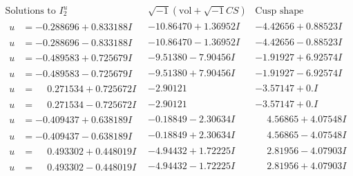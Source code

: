 \documentclass[1p]{elsarticle_modified}
\theoremstyle{definition}
\newcommand{\I}{\sqrt{-1}}
\begin{document}
$$\begin{array}{c|c|c}  
\text{Solutions to }I^u_{2}& \I (\text{vol} + \sqrt{-1}CS) & \text{Cusp shape}\\
 \hline 
\begin{aligned}
u &= -0.288696 + 0.833188 I\end{aligned}
 & -10.86470 + 1.36952 I & -4.42656 + 0.88523 I \\ \hline\begin{aligned}
u &= -0.288696 - 0.833188 I\end{aligned}
 & -10.86470 - 1.36952 I & -4.42656 - 0.88523 I \\ \hline\begin{aligned}
u &= -0.489583 + 0.725679 I\end{aligned}
 & -9.51380 - 7.90456 I & -1.91927 + 6.92574 I \\ \hline\begin{aligned}
u &= -0.489583 - 0.725679 I\end{aligned}
 & -9.51380 + 7.90456 I & -1.91927 - 6.92574 I \\ \hline\begin{aligned}
u &= \phantom{-}0.271534 + 0.725672 I\end{aligned}
 & -2.90121\phantom{ +0.000000I} & -3.57147 + 0. I\phantom{ +0.000000I} \\ \hline\begin{aligned}
u &= \phantom{-}0.271534 - 0.725672 I\end{aligned}
 & -2.90121\phantom{ +0.000000I} & -3.57147 + 0. I\phantom{ +0.000000I} \\ \hline\begin{aligned}
u &= -0.409437 + 0.638189 I\end{aligned}
 & -0.18849 - 2.30634 I & \phantom{-}4.56865 + 4.07548 I \\ \hline\begin{aligned}
u &= -0.409437 - 0.638189 I\end{aligned}
 & -0.18849 + 2.30634 I & \phantom{-}4.56865 - 4.07548 I \\ \hline\begin{aligned}
u &= \phantom{-}0.493302 + 0.448019 I\end{aligned}
 & -4.94432 + 1.72225 I & \phantom{-}2.81956 - 4.07903 I \\ \hline\begin{aligned}
u &= \phantom{-}0.493302 - 0.448019 I\end{aligned}
 & -4.94432 - 1.72225 I & \phantom{-}2.81956 + 4.07903 I \\ \hline\begin{aligned}

\end{aligned}
\end{array}$$
\end{document}

